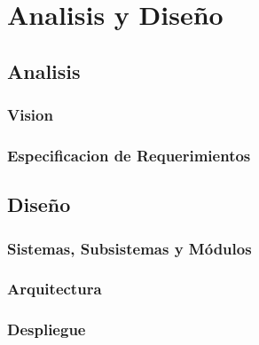 
\chapter{Analisis y Diseño}
\label{capitulo3}

\section{Analisis}

\subsection{Vision}

\subsection{Especificacion de Requerimientos}

\section{Diseño}

\subsection{Sistemas, Subsistemas y Módulos}

\subsection{Arquitectura}

\subsection{Despliegue}
